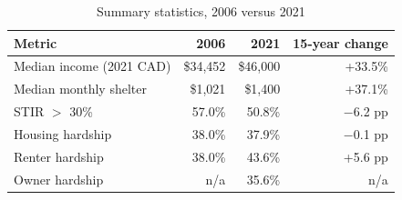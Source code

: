 \begin{table}[htbp]
\centering
\caption{Summary statistics, 2006 versus 2021}
\label{tab:summary}
\small
\begin{tabular}{lrrr}
\toprule
Metric & 2006 & 2021 & 15-year change \\
\midrule
Median income (2021 CAD) & \$34,452 & \$46,000 & +33.5\% \\
Median monthly shelter & \$1,021 & \$1,400 & +37.1\% \\
STIR $>$ 30\% & 57.0\% & 50.8\% & $-$6.2 pp \\
Housing hardship & 38.0\% & 37.9\% & $-$0.1 pp \\
Renter hardship & 38.0\% & 43.6\% & +5.6 pp \\
Owner hardship & n/a & 35.6\% & n/a \\
\bottomrule
\end{tabular}
\par{}
\end{table}
